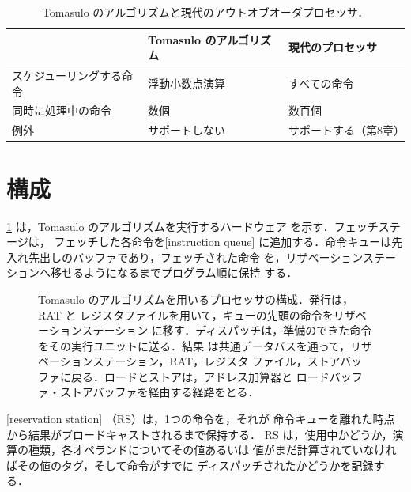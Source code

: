 \documentclass[../main.tex]{subfiles}
\begin{document}
\begin{table}[htbp]
  \centering\small
  \caption{Tomasulo のアルゴリズムと現代のアウトオブオーダプロセッサ．}
  \label{tab:l07-modern}
  \begin{tabular}{@{}lll@{}}
    \toprule
    & Tomasulo のアルゴリズム & 現代のプロセッサ \\
    \midrule
    スケジューリングする命令 & 浮動小数点演算 & すべての命令 \\
    同時に処理中の命令       & 数個           & 数百個 \\
    例外                     & サポートしない & サポートする（第8章） \\
    \bottomrule
  \end{tabular}
\end{table}

\section{構成}
\label{sec:l07-organization}

\cref{fig:l07-tomasulo} は，Tomasulo のアルゴリズムを実行するハードウェア
を示す．フェッチステージは，
フェッチした各命令を[instruction queue]%
に追加する．命令キューは先入れ先出しのバッファであり，フェッチされた命令
を，リザベーションステーションへ移せるようになるまでプログラム順に保持
する．

\begin{figure}[htbp]
  \centering
  
  \caption{Tomasulo のアルゴリズムを用いるプロセッサの構成．発行は，RAT と
    レジスタファイルを用いて，キューの先頭の命令をリザベーションステーション
    に移す．ディスパッチは，準備のできた命令をその実行ユニットに送る．結果
    は共通データバスを通って，リザベーションステーション，RAT，レジスタ
    ファイル，ストアバッファに戻る．ロードとストアは，アドレス加算器と
    ロードバッファ・ストアバッファを経由する経路をとる．}
  \label{fig:l07-tomasulo}
\end{figure}

\begin{definition}[リザベーションステーション]
  \label{def:l07-rs}
  [reservation station]%
  （RS）は，1つの命令を，それが
  命令キューを離れた時点から結果がブロードキャストされるまで保持する．
  RS は，使用中かどうか，演算の種類，各オペランドについてその値あるいは
  値がまだ計算されていなければその値のタグ，そして命令がすでに
  ディスパッチされたかどうかを記録する．
\end{definition}
\end{document}
